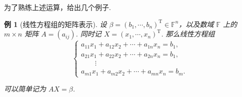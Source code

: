\documentclass[10pt,openany]{article}
\theoremstyle{thmstyle} %
\theoremstyle{defstyle} %
\theoremstyle{prostyle} %
\theoremstyle{exastyle}
\newtheorem{example}[theorem]{例}
\theoremstyle{remstyle}
\newcommand{\T}{^{\text{T}}}
\newcommand{\F}{\mathbb{F}}
\begin{document}
为了熟练上述运算，给出几个例子.

\begin{example}[线性方程组的矩阵表示]
	设 \( \beta=(b_1,\cdots,b_n)\T \in \F^n \)，以及数域 \( \F \) 上的 \( m \times n \) 矩阵 \( A=(a_{ij}) \). 同时记 \( X=(x_1,\cdots,x_n)\T  \). 那么线性方程组
	\[ \left\{\begin{array}{l}
		a_{11}x_1+a_{12}x_2+\cdots+a_{1n}x_n=b_1, \\
		a_{21}x_1+a_{22}x_2+\cdots+a_{2n}x_n=b_1, \\
		\qquad \vdots \\
		a_{m1}x_1+a_{m2}x_2+\cdots+a_{mn}x_n=b_m.
	\end{array}\right. \]
	
	可以简单记为 \( AX=\beta \).
\end{example}
\end{document}
